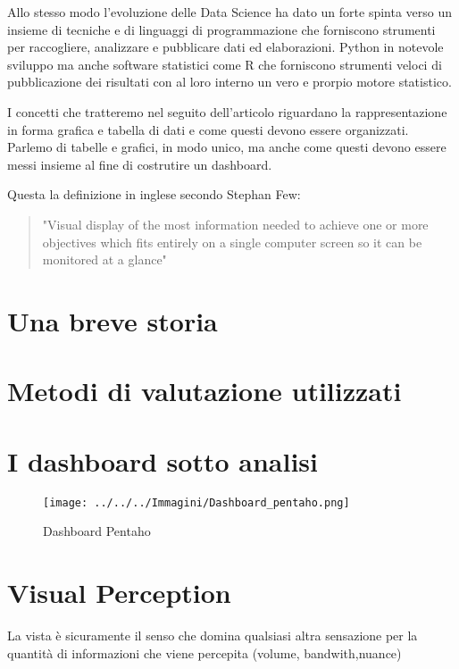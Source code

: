 \documentclass{ium}
\begin{document}
Allo stesso modo l'evoluzione delle Data Science ha dato un forte spinta verso un insieme di tecniche e di linguaggi di programmazione che forniscono strumenti per raccogliere, analizzare e pubblicare dati ed elaborazioni. Python in notevole sviluppo ma anche software statistici come R che forniscono strumenti veloci di pubblicazione dei risultati con al loro interno un vero e prorpio motore statistico.

I concetti che tratteremo nel seguito dell'articolo riguardano la rappresentazione in forma grafica e tabella di dati e come questi devono essere organizzati. Parlemo di tabelle e grafici, in modo unico, ma anche come questi devono essere messi insieme al fine di costrutire un dashboard.

Questa la definizione in inglese secondo Stephan Few:
\begin{quotation}
"Visual display of the most information needed to achieve one or more objectives which fits entirely on a single computer screen so it can be monitored at a glance"
\end{quotation}



\section{Una breve storia}


\section{Metodi di valutazione utilizzati}
\section{I dashboard sotto analisi}
\begin{center}




	\begin{figure*}
	\texttt{[image: ../../../Immagini/Dashboard\_pentaho.png]} 
	\caption{Dashboard Pentaho}

	\end{figure*}
\end{center}

\section{Visual Perception}

La vista è sicuramente il senso che domina qualsiasi altra sensazione per la quantità di informazioni che viene percepita (volume, bandwith,nuance)
\end{document}
